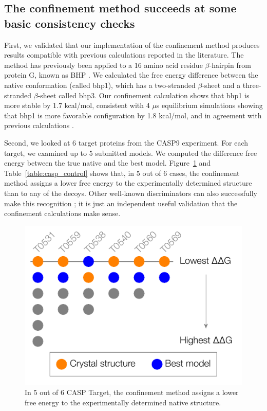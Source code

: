 \documentclass[12pt]{article}
\begin{document}
\subsection{The confinement method succeeds at some basic consistency checks}

First, we validated that our implementation of the confinement method produces results compatible with previous calculations reported in the 
literature.  The method has previously been applied to a 16 amino acid residue $\beta$-hairpin from protein G, known as 
BHP \cite{Cecchini2009}. We calculated the free energy difference between the native conformation (called bhp1), which has 
a two-stranded $\beta$-sheet and a three-stranded $\beta$-sheet called bhp3.  Our confinement calculation shows that bhp1 
is more stable by 1.7 kcal/mol, consistent with 4 $\mu$s equilibrium simulations showing that bhp1 is more favorable configuration 
by 1.8 kcal/mol, and in agreement with previous calculations \cite{Cecchini2009}.

Second, we looked at 6 target proteins from the CASP9 experiment.  For each target, we examined up to 5 submitted models.  We 
computed the difference free energy between the true native and the best model. Figure~\ref{fig:summary_casp} and 
Table~\ref{table:casp_control} shows that, in 5 
out of 6 cases, the confinement method assigns a lower free energy to the experimentally determined structure than to any of the 
decoys.  Other well-known discriminators  can also successfully make this recognition \cite{Sheffler2009}; 
 it is just an independent useful validation that the confinement calculations make sense. 



\begin{figure}
\begin{center}
\includegraphics[width=3.5 in,height=3.2 in]{casp.pdf}
\end{center}
\caption{In 5 out of 6 CASP Target, the confinement method assigns a lower free energy to the experimentally determined native structure.} 
\label{fig:summary_casp}
\end{figure}
\end{document}
